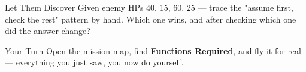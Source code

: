\documentclass[aspectratio=169]{beamer}
\begin{document}
\begin{frame}{Let Them Discover}
    \large
    Given enemy HPs 40, 15, 60, 25 --- trace the "assume first, check the rest" pattern by hand. Which one wins, and after checking which one did the answer change?
\end{frame}

\begin{frame}{Your Turn}
    \Large
    Open the mission map, find \textbf{Functions Required}, and fly it for real ---
    everything you just saw, you now do yourself.
\end{frame}
\end{document}
